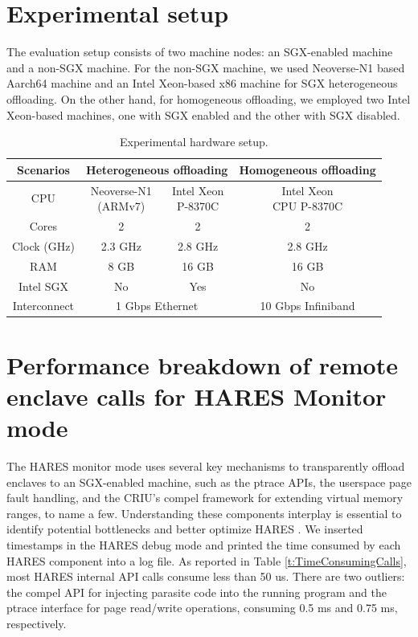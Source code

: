 \documentclass[article, doublespace,nopageskip]{VTthesis} %
\newcommand{\monitor}{HARES }
\begin{document}
    \section{Experimental setup} \label{ase:experimental setup}
    The evaluation setup consists of two machine nodes: an SGX-enabled machine and a non-SGX machine. For the non-SGX machine, we used Neoverse-N1 based Aarch64 machine and an Intel Xeon-based x86 machine for SGX heterogeneous offloading. On the other hand, for homogeneous offloading, we employed two Intel Xeon-based machines, one with SGX enabled and the other with SGX disabled. 

    \begin{table}[h]
	\centering
	\footnotesize
	\caption{Experimental hardware setup.}
	\begin{tabular}{| c | c | c | c |} \hline
		Scenarios & \multicolumn{2}{|c|}{Heterogeneous offloading} & Homogeneous offloading \\ \hline \hline
		CPU & \makecell{Neoverse-N1 \\(ARMv7)} & \makecell{Intel Xeon \\P-8370C} & \makecell{Intel Xeon \\CPU P-8370C} \\ \hline
		Cores & 2 & 2 & 2 \\ \hline
		Clock (GHz) & 2.3 GHz & 2.8 GHz & 2.8 GHz \\ \hline
		RAM & 8 GB & 16 GB & 16 GB \\ \hline
		Intel SGX & No & Yes & No \\ \hline
       Interconnect & \multicolumn{2}{|c|}{1 Gbps Ethernet} & 10 Gbps Infiniband \\ \hline
	\end{tabular}
	\label{t:setup}
    \end{table}
    
    \section{Performance breakdown of remote enclave calls for \monitor Monitor mode} \label{ase:Performance breakdown of remote enclave calls}
    The \monitor monitor mode uses several key mechanisms to transparently offload enclaves to an SGX-enabled machine, such as the ptrace APIs, the userspace page fault handling, and the CRIU's compel framework for extending virtual memory ranges, to name a few. Understanding these components interplay is essential to identify potential bottlenecks and better optimize \monitor. We inserted timestamps in the \monitor debug mode and printed the time consumed by each \monitor component into a log file. As reported in Table \ref{t:TimeConsumingCalls}, most \monitor internal API calls consume less than 50 us. There are two outliers: the compel API for injecting parasite code into the running program and the ptrace interface for page read/write operations, consuming 0.5 ms and 0.75 ms, respectively.
\end{document}
